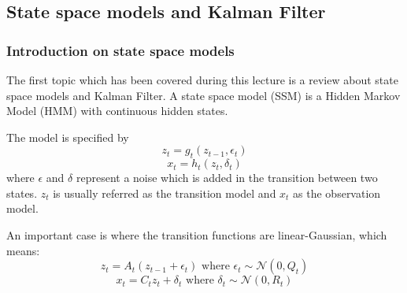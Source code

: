 \documentclass{article}
\begin{document}

\subsection{State space models and Kalman Filter}

\subsubsection{Introduction on state space models}
The first topic which has been covered during this lecture is a review about state space models and Kalman Filter.
A state space model (SSM) is a Hidden Markov Model (HMM) with continuous hidden states.


\begin{center}
\end{center}


The model is specified by
\[z_t = g_t(z_{t-1}, \epsilon_t)\]
\[x_t = h_t(z_t, \delta_t)\]
where $\epsilon$ and $\delta$ represent a noise which is added in the transition between two states. $z_t$ is usually referred as the transition model and $x_t$ as the observation model. 

An important case is where the transition functions are linear-Gaussian, which means:
\[z_t = A_t(z_{t-1} + \epsilon_t) \text{ where } \epsilon_t \sim \mathcal{N}(0, Q_t)\]
\[x_t = C_t z_t + \delta_t \text{ where } \delta_t \sim \mathcal{N}(0, R_t)\]
\end{document}
